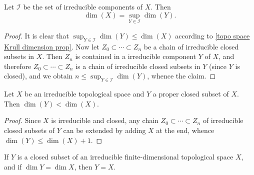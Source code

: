 \begin{proposition}
Let $\mathcal{I}$ be the set of irreducible components of $X$. Then
\[\dim(X)=\sup_{Y\in\mathcal{I}}\dim(Y).\]
\end{proposition}
\begin{proof}
It is clear that $\sup_{Y\in\mathcal{I}}\dim(Y)\leq\dim(X)$ according to \cref{topo space Krull dimension prop}. Now let $Z_0\subset\cdots\subset Z_n$ be a chain of irreducible closed subsets in $X$. Then $Z_n$ is contained in a irreducible component $Y$ of $X$, and therefore $Z_0\subset\cdots\subset Z_n$ is a chain of irreducible closed subsets in $Y$ (since $Y$ is closed), and we obtain $n\leq\sup_{Y\in\mathcal{I}}\dim(Y)$, whence the claim.
\end{proof}
\begin{proposition}\label{topo space irreducible proper closed dimension small}
Let $X$ be an irreducible topological space and $Y$ a proper closed subset of $X$. Then $\dim(Y)<\dim(X)$.
\end{proposition}
\begin{proof}
Since $X$ is irreducible and closed, any chain $Z_0\subset\cdots\subset Z_n$ of irreducible closed subsets of $Y$ can be extended by adding $X$ at the end, whence $\dim(Y)\leq\dim(X)+1$.
\end{proof}
\begin{corollary}
If $Y$ is a closed subset of an irreducible finite-dimensional topological space $X$, and if $\dim Y=\dim X$, then $Y=X$.
\end{corollary}
